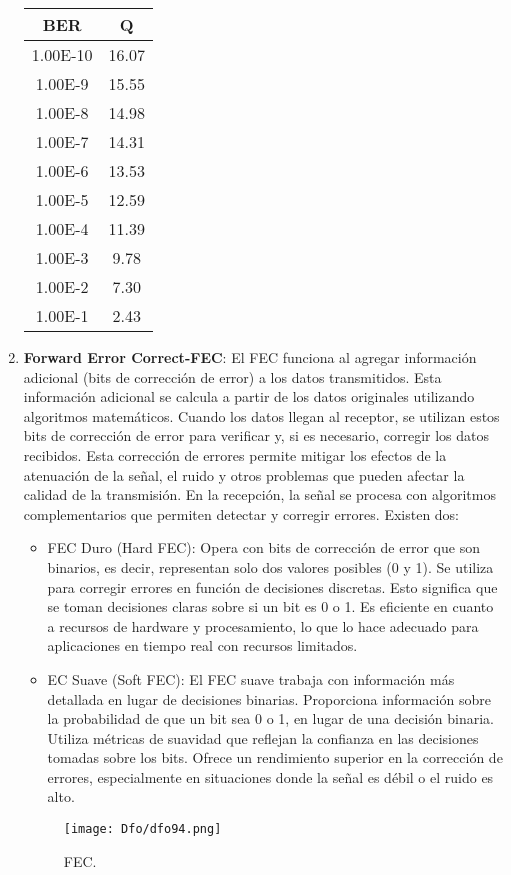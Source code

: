\documentclass[
	12pt, %
	fleqn, %
	a4paper, %
	oneside, %
]{LegrandOrangeBook}
\begin{document}
\begin{enumerate}
\begin{center}
\begin{tabular}{|c|c|}
\hline
\rowcolor[HTML]{ECF4FF} 
BER      & Q     \\ \hline
1.00E-10 & 16.07 \\ \hline
1.00E-9  & 15.55 \\ \hline
1.00E-8  & 14.98 \\ \hline
1.00E-7  & 14.31 \\ \hline
1.00E-6  & 13.53 \\ \hline
1.00E-5  & 12.59 \\ \hline
1.00E-4  & 11.39 \\ \hline
1.00E-3  & 9.78  \\ \hline
1.00E-2  & 7.30  \\ \hline
1.00E-1  & 2.43  \\ \hline
\end{tabular}
\end{center}
\item \textbf{Forward Error Correct-FEC}: El FEC funciona al agregar información adicional (bits de corrección de error) a los datos transmitidos. Esta información adicional se calcula a partir de los datos originales utilizando algoritmos matemáticos. Cuando los datos llegan al receptor, se utilizan estos bits de corrección de error para verificar y, si es necesario, corregir los datos recibidos. Esta corrección de errores permite mitigar los efectos de la atenuación de la señal, el ruido y otros problemas que pueden afectar la calidad de la transmisión. En la recepción, la señal se procesa con algoritmos complementarios que permiten detectar y corregir errores. Existen dos:
\begin{itemize}
\item FEC Duro (Hard FEC): Opera con bits de corrección de error que son binarios, es decir, representan solo dos valores posibles (0 y 1).
Se utiliza para corregir errores en función de decisiones discretas. Esto significa que se toman decisiones claras sobre si un bit es 0 o 1.
Es eficiente en cuanto a recursos de hardware y procesamiento, lo que lo hace adecuado para aplicaciones en tiempo real con recursos limitados.
\item EC Suave (Soft FEC): El FEC suave trabaja con información más detallada en lugar de decisiones binarias. Proporciona información sobre la probabilidad de que un bit sea 0 o 1, en lugar de una decisión binaria.
Utiliza métricas de suavidad que reflejan la confianza en las decisiones tomadas sobre los bits.
Ofrece un rendimiento superior en la corrección de errores, especialmente en situaciones donde la señal es débil o el ruido es alto.
\end{itemize}
\begin{figure}[H]
\centering
\texttt{[image: Dfo/dfo94.png]}
\caption{FEC.}
\end{figure}
\end{enumerate}
\end{document}
